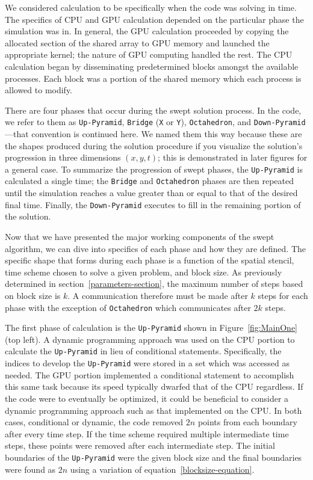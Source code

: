 \documentclass[preprints,article,accept,moreauthors,pdftex]{Definitions/mdpi}
\def\Up{\texttt{Up-Pyramid}}
\def\Down{\texttt{Down-Pyramid}}
\def\Oct{\texttt{Octahedron}}
\begin{document}
We considered calculation to be specifically when the code was solving in time. The specifics of CPU and GPU calculation depended on the particular phase the simulation was in. In general, the GPU calculation proceeded by copying the allocated section of the shared array to GPU memory and launched the appropriate kernel; the nature of GPU computing handled the rest. The CPU calculation began by disseminating predetermined blocks amongst the available processes. Each block was a portion of the shared memory which each process is allowed to modify.
 
There are four phases that occur during the swept solution process. In the code, we refer to them as \Up{}, \texttt{Bridge} (\texttt{X} or \texttt{Y}), \Oct{}, and \Down{}---that convention is continued here. We named them this way because these are the shapes produced during the solution procedure if you visualize the solution's progression in three dimensions $(x,y,t)$; this is demonstrated in later figures for a general case. To summarize the progression of swept phases, the \Up{} is calculated a single time; the \texttt{Bridge} and \Oct{} phases are then repeated until the simulation reaches a value greater than or equal to that of the desired final time. Finally, the \Down{} executes to fill in the remaining portion of the solution. 

Now that we have presented the major working components of the swept algorithm, we can dive into specifics of each phase and how they are defined. The specific shape that forms during each phase is a function of the spatial stencil, time scheme chosen to solve a given problem, and block size. As previously determined in section~\ref{parameters-section}, the maximum number of steps based on block size is $k$. A communication therefore must be made after $k$ steps for each phase with the exception of \Oct{} which communicates after $2k$ steps.
 
The first phase of calculation is the \Up{} shown in Figure~\ref{fig:MainOne} (top left). A dynamic programming approach was used on the CPU portion to calculate the \Up{} in lieu of conditional statements. Specifically, the indices to develop the \Up{} were stored in a set which was accessed as needed. The GPU portion implemented a conditional statement to accomplish this same task because its speed typically dwarfed that of the CPU regardless. If the code were to eventually be optimized, it could be beneficial to consider a dynamic programming approach such as that implemented on the CPU. In both cases, conditional or dynamic, the code removed $2n$ points from each boundary after every time step. If the time scheme required multiple intermediate time steps, these points were removed after each intermediate step. The initial boundaries of the \Up{} were the given block size and the final boundaries were found as $2n$ using a variation of equation~\ref{blocksize-equation}.
\end{document}
